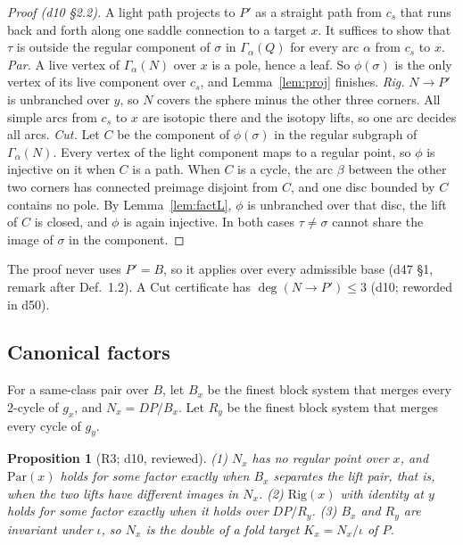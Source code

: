 \documentclass[11pt]{article}
\newtheorem{proposition}{Proposition}
\theoremstyle{definition}
\theoremstyle{remark}
\newcommand{\Par}{\mathrm{Par}}
\newcommand{\Rig}{\mathrm{Rig}}
\newcommand{\Cut}{\mathrm{Cut}}
\begin{document}
\begin{proof}[Proof (d10 \S2.2)]
A light path projects to $P'$ as a straight path from $c_s$ that runs back and
forth along one saddle connection to a target $x$. It suffices to show that
$\tau$ is outside the regular component of $\sigma$ in $\Gamma_\alpha(Q)$ for
every arc $\alpha$ from $c_s$ to $x$.
\emph{Par.} A live vertex of $\Gamma_\alpha(N)$ over $x$ is a pole, hence a
leaf. So $\phi(\sigma)$ is the only vertex of its live component over $c_s$,
and Lemma~\ref{lem:proj} finishes.
\emph{Rig.} $N\to P'$ is unbranched over $y$, so $N$ covers the sphere minus
the other three corners. All simple arcs from $c_s$ to $x$ are isotopic there
and the isotopy lifts, so one arc decides all arcs.
\emph{Cut.} Let $C$ be the component of $\phi(\sigma)$ in the regular subgraph
of $\Gamma_\alpha(N)$. Every vertex of the light component maps to a regular
point, so $\phi$ is injective on it when $C$ is a path. When $C$ is a cycle,
the arc $\beta$ between the other two corners has connected preimage disjoint
from $C$, and one disc bounded by $C$ contains no pole. By
Lemma~\ref{lem:factL}, $\phi$ is unbranched over that disc, the lift of $C$ is
closed, and $\phi$ is again injective. In both cases $\tau\ne\sigma$ cannot share
the image of $\sigma$ in the component.
\end{proof}

The proof never uses $P'=B$, so it applies over every admissible base
(d47 \S1, remark after Def.~1.2). A $\Cut$ certificate has
$\deg(N\to P')\le 3$ (d10; reworded in d50).

\subsection{Canonical factors}
For a same-class pair over $B$, let $B_x$ be the finest block system that
merges every $2$-cycle of $g_x$, and $N_x=DP/B_x$. Let $R_y$ be the finest
block system that merges every cycle of $g_y$.

\begin{proposition}[R3; d10, reviewed]\label{prop:R3}
(1) $N_x$ has no regular point over $x$, and $\Par(x)$ holds for some factor
exactly when $B_x$ separates the lift pair, that is, when the two lifts have
different images in $N_x$.
(2) $\Rig(x)$ with identity at $y$ holds for some factor exactly when it holds
over $DP/R_y$.
(3) $B_x$ and $R_y$ are invariant under $\iota$, so $N_x$ is the double of a
fold target $K_x=N_x/\iota$ of $P$.
\end{proposition}
\end{document}
